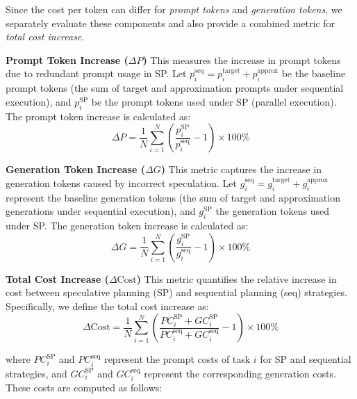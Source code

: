
Since the cost per token can differ for \emph{prompt tokens} and \emph{generation tokens}, we separately evaluate these components and also provide a combined metric for \emph{total cost increase}.

\textbf{Prompt Token Increase ($\Delta P$)} This measures the increase in prompt tokens due to redundant prompt usage in SP. Let $p^{\text{seq}}_i = p^{\text{target}}_i + p^{\text{approx}}_i$ be the baseline prompt tokens (the sum of target and approximation prompts under sequential execution), and $p^{\text{SP}}_i$ be the prompt tokens used under SP (parallel execution). The prompt token increase is calculated as:
\begin{equation}
    \Delta P = \frac{1}{N} \sum_{i=1}^N \left(\frac{p^{\text{SP}}_i}{p^{\text{seq}}_i} - 1\right) \times 100\%
\end{equation}
    
\textbf{Generation Token Increase ($\Delta G$)} This metric captures the increase in generation tokens caused by incorrect speculation. Let $g^{\text{seq}}_i = g^{\text{target}}_i + g^{\text{approx}}_i$ represent the baseline generation tokens (the sum of target and approximation generations under sequential execution), and $g^{\text{SP}}_i$ the generation tokens used under SP. The generation token increase is calculated as:
\begin{equation}
    \Delta G = \frac{1}{N} \sum_{i=1}^N \left(\frac{g^{\text{SP}}_i}{g^{\text{seq}}_i} - 1\right) \times 100\%
\end{equation}


\textbf{Total Cost Increase ($\Delta {\text{Cost}}$)} This metric quantifies the relative increase in cost between speculative planning (SP) and sequential planning (seq) strategies. Specifically, we define the total cost increase as:
\begin{equation}
    \Delta \text{Cost} = \frac{1}{N} \sum_{i=1}^N
    \left( \frac{PC^{\text{SP}}_i + GC^{\text{SP}}_i}{PC^{\text{seq}}_i + GC^{\text{seq}}_i} - 1 \right) \times 100\%
\end{equation}

where $PC^{\text{SP}}_i$ and $PC^{\text{seq}}_i$ represent the prompt costs of task $i$ for SP and sequential strategies, and $GC^{\text{SP}}_i$ and $GC^{\text{seq}}_i$ represent the corresponding generation costs. These costs are computed as follows:

